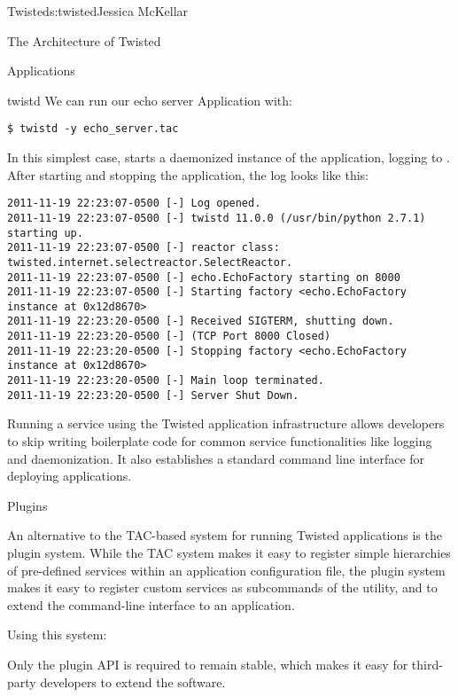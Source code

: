 \begin{aosachapter}{Twisted}{s:twisted}{Jessica McKellar}
\begin{aosasect1}{The Architecture of Twisted}
\begin{aosasect2}{Applications}
\begin{aosasect3}{twistd}
We can run our echo server Application with:

\begin{verbatim}
$ twistd -y echo_server.tac
\end{verbatim}

In this simplest case,  starts a daemonized instance of the
application, logging to \linebreak
{}. After starting and stopping the
application, the log looks like this:

\begin{verbatim}
2011-11-19 22:23:07-0500 [-] Log opened.
2011-11-19 22:23:07-0500 [-] twistd 11.0.0 (/usr/bin/python 2.7.1) starting up.
2011-11-19 22:23:07-0500 [-] reactor class: twisted.internet.selectreactor.SelectReactor.
2011-11-19 22:23:07-0500 [-] echo.EchoFactory starting on 8000
2011-11-19 22:23:07-0500 [-] Starting factory <echo.EchoFactory instance at 0x12d8670>
2011-11-19 22:23:20-0500 [-] Received SIGTERM, shutting down.
2011-11-19 22:23:20-0500 [-] (TCP Port 8000 Closed)
2011-11-19 22:23:20-0500 [-] Stopping factory <echo.EchoFactory instance at 0x12d8670>
2011-11-19 22:23:20-0500 [-] Main loop terminated.
2011-11-19 22:23:20-0500 [-] Server Shut Down.
\end{verbatim}

Running a service using the Twisted application infrastructure allows
developers to skip writing boilerplate code for common service functionalities
like logging and daemonization. It also establishes a standard command line
interface for deploying applications.

\end{aosasect3}

\begin{aosasect3}{Plugins}

An alternative to the TAC-based system for running Twisted applications is
the plugin system. While the TAC system makes it easy to register simple
hierarchies of pre-defined services within an application configuration file,
the plugin system makes it easy to register custom services as subcommands of
the  utility, and to extend the command-line interface to an
application.

Using this system:

\begin{aosaenumerate}

\item Only the plugin API is required to remain stable, which makes it
  easy for third-party developers to extend the software.


\end{aosaenumerate}
\end{aosasect3}
\end{aosasect2}
\end{aosasect1}
\end{aosachapter}
